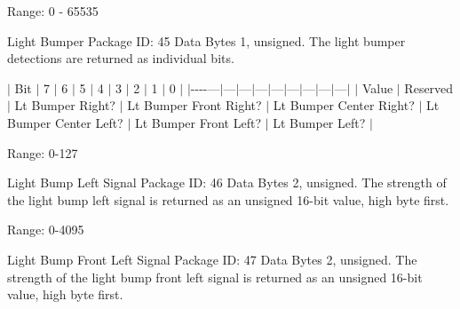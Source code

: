 \begin{Desc}
\begin{description}
Range\+: 0 -\/ 65535 \item[{\em 
\hypertarget{group__roomba-lib_gga46f008b5055c4a08d3123c6a3478373ea11af024cc8c3de71acadd02c432d55ce}{}R\+O\+O\+M\+B\+A\+\_\+\+L\+I\+G\+H\+T\+\_\+\+B\+U\+M\+P\+E\+R\label{group__roomba-lib_gga46f008b5055c4a08d3123c6a3478373ea11af024cc8c3de71acadd02c432d55ce}
}]Light Bumper Package I\+D\+: 45 Data Bytes 1, unsigned. The light bumper detections are returned as individual bits.

$\vert$ Bit $\vert$ 7 $\vert$ 6 $\vert$ 5 $\vert$ 4 $\vert$ 3 $\vert$ 2 $\vert$ 1 $\vert$ 0 $\vert$ $\vert$-\/-\/-\/-\/---$\vert$---$\vert$---$\vert$---$\vert$---$\vert$---$\vert$---$\vert$---$\vert$---$\vert$ $\vert$ Value $\vert$ Reserved $\vert$ Lt Bumper Right? $\vert$ Lt Bumper Front Right? $\vert$ Lt Bumper Center Right? $\vert$ Lt Bumper Center Left? $\vert$ Lt Bumper Front Left? $\vert$ Lt Bumper Left? $\vert$

Range\+: 0-\/127 \item[{\em 
\hypertarget{group__roomba-lib_gga46f008b5055c4a08d3123c6a3478373ea7059f77010aa227d28fd5f875bcae9b1}{}R\+O\+O\+M\+B\+A\+\_\+\+L\+I\+G\+H\+T\+\_\+\+B\+U\+M\+P\+\_\+\+L\+E\+F\+T\label{group__roomba-lib_gga46f008b5055c4a08d3123c6a3478373ea7059f77010aa227d28fd5f875bcae9b1}
}]Light Bump Left Signal Package I\+D\+: 46 Data Bytes 2, unsigned. The strength of the light bump left signal is returned as an unsigned 16-\/bit value, high byte first.

Range\+: 0-\/4095 \item[{\em 
\hypertarget{group__roomba-lib_gga46f008b5055c4a08d3123c6a3478373ea309109f9c53e16a26d9d096c5c56ff71}{}R\+O\+O\+M\+B\+A\+\_\+\+L\+I\+G\+H\+T\+\_\+\+B\+U\+M\+P\+\_\+\+F\+R\+O\+N\+T\+\_\+\+L\+E\+F\+T\label{group__roomba-lib_gga46f008b5055c4a08d3123c6a3478373ea309109f9c53e16a26d9d096c5c56ff71}
}]Light Bump Front Left Signal Package I\+D\+: 47 Data Bytes 2, unsigned. The strength of the light bump front left signal is returned as an unsigned 16-\/bit value, high byte first.


\end{description}
\end{Desc}

